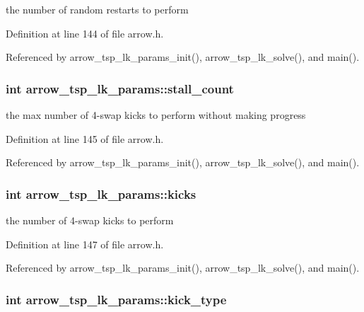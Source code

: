 the number of random restarts to perform 

Definition at line 144 of file arrow.h.

Referenced by arrow\_\-tsp\_\-lk\_\-params\_\-init(), arrow\_\-tsp\_\-lk\_\-solve(), and main().\hypertarget{structarrow__tsp__lk__params_ec5d500e1f1d7dabbbe0d1aae2abfcf8}{
\subsubsection{\setlength{\rightskip}{0pt plus 5cm}int {\bf arrow\_\-tsp\_\-lk\_\-params::stall\_\-count}}}
\label{structarrow__tsp__lk__params_ec5d500e1f1d7dabbbe0d1aae2abfcf8}


the max number of 4-swap kicks to perform without making progress 

Definition at line 145 of file arrow.h.

Referenced by arrow\_\-tsp\_\-lk\_\-params\_\-init(), arrow\_\-tsp\_\-lk\_\-solve(), and main().\hypertarget{structarrow__tsp__lk__params_9744a2fb89bca6b678fec9a6a17255ea}{
\subsubsection{\setlength{\rightskip}{0pt plus 5cm}int {\bf arrow\_\-tsp\_\-lk\_\-params::kicks}}}
\label{structarrow__tsp__lk__params_9744a2fb89bca6b678fec9a6a17255ea}


the number of 4-swap kicks to perform 

Definition at line 147 of file arrow.h.

Referenced by arrow\_\-tsp\_\-lk\_\-params\_\-init(), arrow\_\-tsp\_\-lk\_\-solve(), and main().\hypertarget{structarrow__tsp__lk__params_5b724dc268faa478b5b3e14c19abdc2a}{
\subsubsection{\setlength{\rightskip}{0pt plus 5cm}int {\bf arrow\_\-tsp\_\-lk\_\-params::kick\_\-type}}}
\label{structarrow__tsp__lk__params_5b724dc268faa478b5b3e14c19abdc2a}


